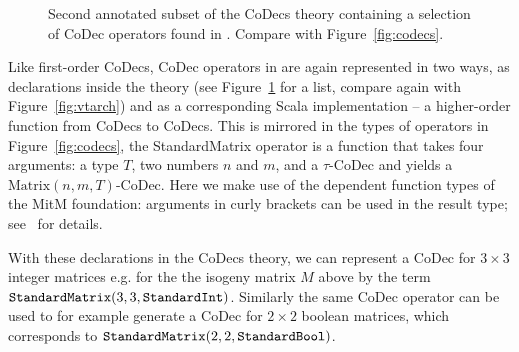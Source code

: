 \begin{figure}[ht]\centering
  \caption[List of Codec Operators]{
    Second annotated subset of the CoDecs theory containing a selection of CoDec operators found in \mmt. 
    Compare with Figure~\ref{fig:codecs}. 
  }
  \label{fig:codecops}
\end{figure}
Like first-order CoDecs, CoDec operators in \mmt are again represented in two ways, as declarations inside the  theory (see Figure~\ref{fig:codecops} for a list, compare again with Figure~\ref{fig:vtarch}) and as a corresponding Scala implementation -- a higher-order function from CoDecs to CoDecs. 
This is mirrored in the types of operators in Figure~\ref{fig:codecs}, the \textsf{StandardMatrix} operator is a function that takes four arguments: a type $T$, two
numbers $n$ and $m$, and a $\tau$-CoDec and yields a $\mathrm{Matrix}(n, m, T)$-CoDec. 
Here we make use of the dependent function types of the MitM foundation: arguments in curly brackets can be used in the result type; see~\cite{RabKoh:WSMSML13} for details.

With these declarations in the \textsf{CoDecs} theory, we can represent a CoDec for $3 \times 3$ integer matrices e.g. for the the isogeny matrix $M$ above by the \ommt term $\plaintt{StandardMatrix}(3, 3, \plaintt{StandardInt})$.
Similarly the same CoDec operator can be used to for example generate a CoDec for $2 \times 2$ boolean matrices, which corresponds to
$\plaintt{StandardMatrix}(2, 2, \plaintt{StandardBool})$. 

